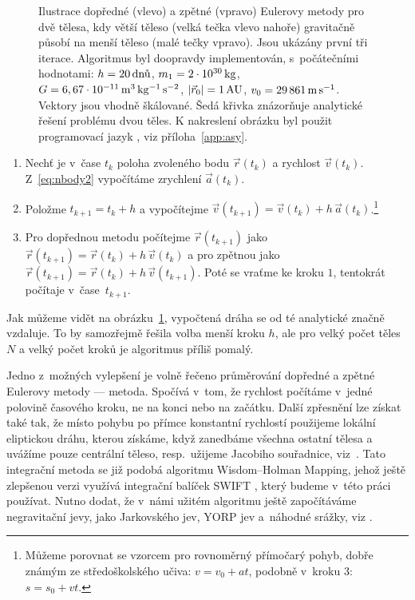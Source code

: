 \documentclass[A4paper, 12pt, oneside]{book}
\begin{document}
\begin{figure} 
	\centering 
	\begin{subfigure}[b]{0.45\textwidth}
	\end{subfigure}
	\begin{subfigure}[b]{0.45\textwidth}
	\end{subfigure}
	\caption{Ilustrace dopředné (vlevo) a zpětné (vpravo) Eulerovy metody pro dvě tělesa, kdy větší těleso (velká tečka vlevo nahoře) gravitačně působí na menší těleso (malé tečky vpravo). Jsou ukázány první tři iterace. Algoritmus byl doopravdy implementován, s~počátečními hodnotami: $h=20\,{\rm \text{dnů}}$, $m_1=2\cdot10^{30}\,{\rm kg}$, $G=6,67\cdot10^{-11}\,{\rm m^3\,kg^{-1}\,s^{-2}}$, $|\vec{r}_0|=1\,{\rm AU}$, $v_0=29\,861\,{\rm m\,s^{-1}}$. Vektory jsou vhodně škálované. Šedá křivka znázorňuje analytické řešení problému dvou těles. K nakreslení obrázku byl použit programovací jazyk , viz příloha~\ref{app:asy}.} \label{fig:euler}
\end{figure}
\pagebreak
\begin{enumerate}
	\item Nechť je v~čase $t_k$ poloha zvoleného bodu $\vec{r}(t_k)$ a rychlost $\vec{v}(t_k)$. Z~\eqref{eq:nbody2} vypočítáme zrychlení $\vec{a}(t_k)$. 
	\item Položme $t_{k+1} = t_{k}+h$ a vypočítejme $\vec{v}(t_{k+1}) = \vec{v}(t_k) + h\,\vec{a}(t_k)$.\footnote{Můžeme porovnat se vzorcem pro rovnoměrný přímočarý pohyb, dobře známým ze středoškolského učiva: $v = v_0 + at$, podobně v~kroku $3$: $s = s_0 + vt$.}
	\item Pro dopřednou metodu počítejme $\vec{r}(t_{k+1})$ jako $\vec{r}(t_{k+1}) = \vec{r}(t_k) + h\,\vec{v}(t_k)$ a pro zpětnou jako $\vec{r}(t_{k+1}) = \vec{r}(t_k) + h\,\vec{v}(t_{k+1})$. Poté se vraťme ke kroku $1$, tentokrát počítaje v~čase~$t_{k+1}$. 
\end{enumerate}

Jak můžeme vidět na obrázku~\ref{fig:euler}, vypočtená dráha se od té analytické značně vzdaluje. To by samozřejmě řešila volba menší kroku $h$, ale pro velký počet těles $N$ a velký počet kroků je algoritmus příliš pomalý.

Jedno z~možných vylepšení je volně řečeno průměrování dopředné a zpětné Eulerovy metody ---  metoda. Spočívá v~tom, že rychlost počítáme v~jedné polovině časového kroku, ne na konci nebo na začátku. Další zpřesnění lze získat také tak, že místo pohybu po přímce konstantní rychlostí použijeme lokální eliptickou dráhu, kterou získáme, když zanedbáme všechna ostatní tělesa a uvážíme pouze centrální těleso, resp.\ užijeme Jacobiho souřadnice, viz~\cite{wisdom91}. Tato integrační metoda se již podobá algoritmu Wisdom--Holman Mapping, jehož ještě zlepšenou verzi využívá integrační balíček SWIFT \cite{levison94}, který budeme v~této práci používat. Nutno dodat, že v~námi užitém algoritmu ještě započítáváme negravitační jevy, jako Jarkovského jev, YORP jev a~náhodné srážky, viz \cite{broz11}.
\end{document}
